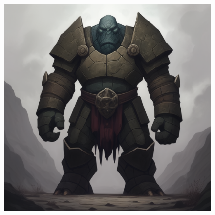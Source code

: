 
\begin{figure}[h]
\begin{center}
\includegraphics[scale=0.24]{img/ai-images/golem.png}
\end{center}
\end{figure}
